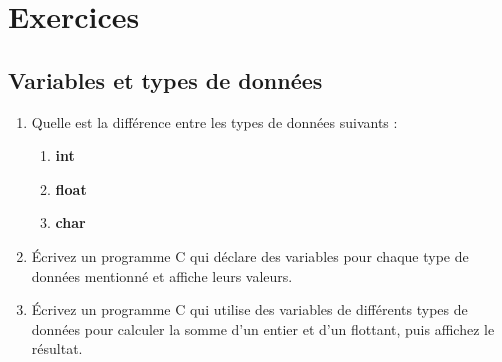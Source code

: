 \section{Exercices}

\subsection{Variables et types de données}
\begin{enumerate}
	\item Quelle est la différence entre les types de données suivants :
	\begin{enumerate}
		\item \textbf{int}
		\item \textbf{float}
		\item \textbf{char}
	\end{enumerate}
	
	\item Écrivez un programme C qui déclare des variables pour chaque type de données mentionné et affiche leurs valeurs.
		
			
			
	
	\item Écrivez un programme C qui utilise des variables de différents types de données pour calculer la somme d'un entier et d'un flottant, puis affichez le résultat.
		
			
			
			
	

\end{enumerate}
